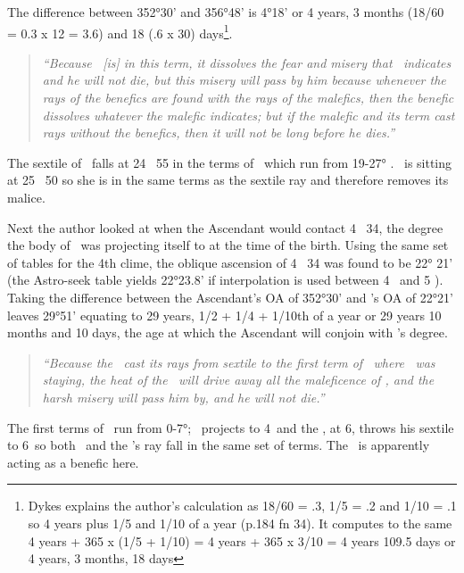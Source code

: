The difference between 352°30' and 356°48' is 4°18' or 4 years, 3 months (18/60 = 0.3 x 12 = 3.6) and 18 (.6 x 30) days\footnote{Dykes explains the author's calculation as 18/60 = .3, 1/5 = .2 and 1/10 = .1 so 4 years plus 1/5 and 1/10 of a year (p.184 fn 34). It computes to the same 4 years + 365 x (1/5 + 1/10) = 4 years + 365 x 3/10 = 4 years 109.5 days or 4 years, 3 months, 18 days}.

\begin{quote}
\textsl{``Because  \Venus\, [is] in this term, it dissolves the fear and misery that \Mars\, indicates and he will not die, but this misery will pass by him because whenever the rays of the benefics are found with the rays of the malefics, then the benefic dissolves whatever the malefic indicates; but if the malefic and its term cast rays without the benefics, then it will not be long before he dies.''}
\end{quote}

The sextile of \Mars\, falls at 24 \Pisces\, 55 in the terms of \Mars\, which run from 19-27° \Pisces. \Venus\, is sitting at 25 \Pisces\, 50 so she is in the same terms as the sextile ray and therefore removes its malice.

Next the author looked at when the Ascendant would contact 4 \Taurus\, 34, the degree the body of \Saturn\, was projecting itself to at the time of the birth. Using the same set of tables for the 4th clime, the oblique ascension of 4 \Taurus\, 34 was found to be 22° 21' (the Astro-seek table yields 22°23.8' if interpolation is used between 4 \Taurus\, and 5 \Taurus). Taking the difference between the Ascendant's OA of 352°30' and \Saturn's OA of 22°21' leaves 29°51' equating to 29 years, 1/2 + 1/4 + 1/10th of a year or 29 years 10 months and 10 days, the age at which the Ascendant will conjoin with \Saturn's degree.

\begin{quote}
\textsl{``Because  the \Sun\, cast its rays from sextile to the first term of \Taurus\, where \Saturn\, was staying, the heat of the \Sun\, will drive away all the maleficence of \Saturn, and the harsh misery will pass him by, and he will not die.''}
\end{quote}

The first terms of \Taurus\, run from 0-7°; \Saturn\, projects to 4\Taurus\, and the \Sun, at 6\Pisces, throws his sextile to 6\Taurus\, so both \Saturn\, and the \Sun's ray fall in the same set of terms. The \Sun\, is apparently acting as a benefic here.

